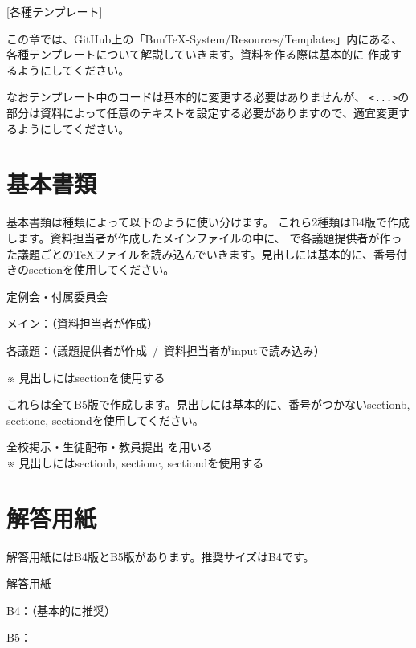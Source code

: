 \newpage
\pagestyle{booklet}
[各種テンプレート]
\begin{multicols*}{2}
この章では、GitHub上の「BunTeX-System/Resources/Templates」内にある、
各種テンプレートについて解説していきます。資料を作る際は基本的に
作成するようにしてください。

なおテンプレート中のコードは基本的に変更する必要はありませんが、
\verb|<...>|の部分は資料によって任意のテキストを設定する必要がありますので、適宜変更するようにしてください。

\section{基本書類}
基本書類は種類によって以下のように使い分けます。
これら2種類はB4版で作成します。資料担当者が作成したメインファイルの中に、\verb||
で各議題提供者が作った議題ごとの\TeX ファイルを読み込んでいきます。見出しには基本的に、番号付きのsectionを使用してください。
\begin{framebox-simple}{定例会・付属委員会}
\begin{reitemize}
    \item メイン：（資料担当者が作成）
    \item 各議題：（議題提供者が作成~/~資料担当者がinputで読み込み）
\end{reitemize}
\noindent ※ 見出しにはsectionを使用する
\end{framebox-simple}

これらは全てB5版で作成します。見出しには基本的に、番号がつかないsectionb, sectionc, sectiondを使用してください。
\begin{framebox-simple}{全校掲示・生徒配布・教員提出}
を用いる\\
\noindent ※ 見出しにはsectionb, sectionc, sectiondを使用する
\end{framebox-simple}

\section{解答用紙}
解答用紙にはB4版とB5版があります。推奨サイズはB4です。
\begin{framebox-simple}{解答用紙}
    \begin{reitemize}
        \item B4：（基本的に推奨）
        \item B5：
    \end{reitemize}
\end{framebox-simple}


\end{multicols*}

